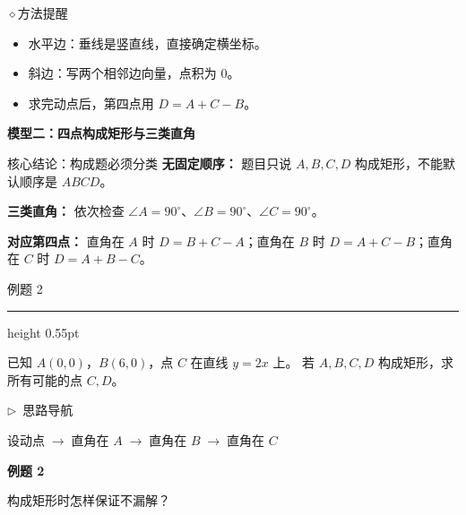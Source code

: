 \documentclass{exam-zh}
\newcommand{\edukai}{\kaishu}
\newcommand{\eduSectionTitle}[1]{%
  \needspace{5\baselineskip}%
  \vspace{2mm}
  {\color{edu-blue}\bfseries\large #1}\par
  \vspace{3mm}
}
\newenvironment{eduSubQuestionItem}[1]{%
  \needspace{4\baselineskip}%
  \vspace{2mm}
  \par\noindent
  \hangindent=8mm\hangafter=1
  {\color{edu-blue}\bfseries #1}\enspace
  \begingroup
  \color{edu-ink}
}{%
  \endgroup
  \par
  \vspace{3mm}
}
\newenvironment{eduAuxItem}[1]{%
  \needspace{4\baselineskip}%
  \vspace{2mm}
  \par\noindent
  \hangindent=8mm\hangafter=1
  {\color{edu-blue}\edukai $\triangleright$~#1}\enspace
  \begingroup
  \color{edu-ink}
  \edukai
}{%
  \endgroup
  \par
  \vspace{4mm}
}
\newcommand{\eduIconPin}{\(\diamond\)}
\newenvironment{eduProblemBlock}[1][题目]{%
  \needspace{8\baselineskip}
  {\small\color{edu-muted}#1}\par
  \vspace{1.5mm}
  {\color{edu-blue}\hrule height 0.55pt}
  \vspace{4.5mm}
  \begingroup
  \color{edu-ink}
  \large
  \setlength{\parskip}{2.2mm}
  \linespread{1.20}\selectfont
}{%
  \par
  \endgroup
  \vspace{6mm}
}
\newenvironment{eduBulletList}{%
  \begin{itemize}[
    label=\textbullet,
    leftmargin=5mm,
    itemsep=1.2mm,
    topsep=0pt,
    parsep=0pt
  ]
}{%
  \end{itemize}
}
\begin{document}
\begin{eduSummaryBlock}{\eduIconPin}{方法提醒}
\begin{eduBulletList}
  \item 水平边：垂线是竖直线，直接确定横坐标。  \item 斜边：写两个相邻边向量，点积为 $0$。  \item 求完动点后，第四点用 $D=A+C-B$。\end{eduBulletList}
\end{eduSummaryBlock}



\clearpage
\eduSectionTitle{模型二：四点构成矩形与三类直角}


\begin{eduSolutionBox}{核心结论：构成题必须分类}
  \begingroup
  \setlength{\parskip}{2.5mm}
\textbf{无固定顺序：} 题目只说 $A,B,C,D$ 构成矩形，不能默认顺序是 $ABCD$。\par
\textbf{三类直角：} 依次检查 $\angle A=90^\circ$、$\angle B=90^\circ$、$\angle C=90^\circ$。\par
\textbf{对应第四点：} 直角在 $A$ 时 $D=B+C-A$；直角在 $B$ 时 $D=A+C-B$；直角在 $C$ 时 $D=A+B-C$。\par
  \endgroup
\end{eduSolutionBox}




\begin{eduProblemBlock}[例题 2]
已知 $A(0,0)$，$B(6,0)$，点 $C$ 在直线 $y=2x$ 上。
若 $A,B,C,D$ 构成矩形，求所有可能的点 $C,D$。

\end{eduProblemBlock}





\begin{eduAuxItem}{思路导航}
设动点$\;\to\;$直角在 $A$$\;\to\;$直角在 $B$$\;\to\;$直角在 $C$\end{eduAuxItem}




\begin{eduSubQuestionItem}{例题 2}
构成矩形时怎样保证不漏解？\end{eduSubQuestionItem}
\end{document}
